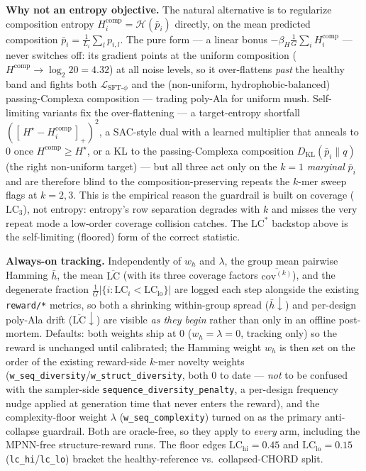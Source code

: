 \documentclass[11pt]{article}
\newcommand{\ttk}[1]{\texttt{\small #1}}
\begin{document}
\textbf{Why not an entropy objective.} The natural alternative is to regularize composition entropy
$H^{\mathrm{comp}}_i=\mathcal H(\bar p_i)$ directly, on the mean predicted composition
$\bar p_i=\frac1{L_i}\sum_l p_{i,l}$. The pure form --- a linear bonus $-\beta_H\frac1G\sum_i
H^{\mathrm{comp}}_i$ --- never switches off: its gradient points at the uniform composition
($H^{\mathrm{comp}}\!\to\!\log_2 20=4.32$) at all noise levels, so it over-flattens \emph{past} the
healthy band and fights both $\mathcal L_{\text{SFT-}\phi}$ and the (non-uniform, hydrophobic-balanced)
passing-Complexa composition --- trading poly-Ala for uniform mush. Self-limiting variants fix the
over-flattening --- a target-entropy shortfall $([\,H^{\star}-H^{\mathrm{comp}}_i\,]_+)^2$, a SAC-style
dual with a learned multiplier that anneals to $0$ once $H^{\mathrm{comp}}\!\ge\!H^{\star}$, or a KL to
the passing-Complexa composition $D_{\mathrm{KL}}(\bar p_i\|q)$ (the right non-uniform target) --- but
all three act only on the $k{=}1$ \emph{marginal} $\bar p_i$ and are therefore blind to the
composition-preserving repeats the $k$-mer sweep flags at $k{=}2,3$. This is the empirical reason the
guardrail is built on coverage ($\mathrm{LC}_3$), not entropy: entropy's row separation degrades with
$k$ and misses the very repeat mode a low-order coverage collision catches. The $\mathrm{LC}^{\ast}$
backstop above is the self-limiting (floored) form of the correct statistic.
\fi

\textbf{Always-on tracking.} Independently of $w_h$ and $\lambda$, the group mean pairwise Hamming $\bar h$, the mean
$\overline{\mathrm{LC}}$ (with its three coverage factors $\overline{\mathrm{cov}^{(k)}}$), and the
degenerate fraction $\tfrac1G\lvert\{i:\mathrm{LC}_i<\mathrm{LC}_{\mathrm{lo}}\}\rvert$ are logged each
step alongside the existing \ttk{reward/*} metrics, so both a shrinking within-group spread
($\bar h\!\downarrow$) and per-design poly-Ala drift ($\overline{\mathrm{LC}}\!\downarrow$) are visible
\emph{as they begin} rather than only in an offline post-mortem. Defaults: both weights ship at $0$
($w_h{=}\lambda{=}0$, tracking only) so the reward is unchanged until calibrated; the Hamming weight
$w_h$ is then set on the order of the existing reward-side $k$-mer novelty weights
(\ttk{w\_seq\_diversity}/\ttk{w\_struct\_diversity}, both $0$ to date --- \emph{not} to be confused with
the sampler-side \ttk{sequence\_diversity\_penalty}, a per-design frequency nudge applied at generation
time that never enters the reward), and the complexity-floor weight $\lambda$ (\ttk{w\_seq\_complexity})
turned on as the primary anti-collapse guardrail. Both are oracle-free, so they apply to \emph{every} arm,
including the MPNN-free structure-reward runs. The floor edges $\mathrm{LC}_{\mathrm{hi}}{=}0.45$ and
$\mathrm{LC}_{\mathrm{lo}}{=}0.15$ (\ttk{lc\_hi}/\ttk{lc\_lo}) bracket the healthy-reference vs.\
collapsed-CHORD split.
\end{document}

